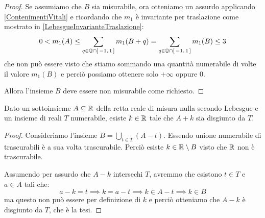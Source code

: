 \begin{proof}
	Se assumiamo che $B$ sia misurabile, ora otteniamo un assurdo applicando \cref{ContenimentiVitali} e ricordando che $m_1$ è invariante per traslazione come mostrato in \cref{LebesgueInvarianteTraslazione}:
	\begin{equation*}
		0<m_1(A)\le \sum_{q\in \mathbb Q\cap[\,-1,\,1\,]} m_1(B+q)= \sum_{q\in \mathbb Q\cap[\,-1,\,1\,]} m_1(B) \le 3
	\end{equation*}
	che non può essere visto che stiamo sommando una quantità numerabile di volte il valore $m_1(B)$ e perciò possiamo ottenere solo $+\infty$ oppure $0$.
	
	Allora l'insieme $B$ deve essere non misurabile come richiesto.
\end{proof}

\begin{exercise}
	Dato un sottoinsieme $A\subseteq\mathbb R$ della retta reale di misura nulla secondo Lebesgue e un insieme di reali $T$ numerabile, esiste $k\in \mathbb R$ tale che $A+k$ sia disgiunto da $T$.
\end{exercise}
\begin{proof}
	Consideriamo l'insieme $B=\bigcup_{t\in T} (A-t)$. 
	Essendo unione numerabile di trascurabili è a sua volta trascurabile.
	Perciò esiste $k\in\mathbb R\setminus B$ visto che $\mathbb R$ non è trascurabile.
	
	Assumendo per assurdo che $A-k$ intersechi $T$, avremmo che esistono $t\in T$ e $a\in A$ tali che:
	\begin{equation*}
		a-k=t\implies k=a-t \implies k\in A-t\implies k\in B	
	\end{equation*}
	ma questo non può essere per definizione di $k$ e perciò otteniamo che $A-k$ è disgiunto da $T$, che è la tesi.
\end{proof}



